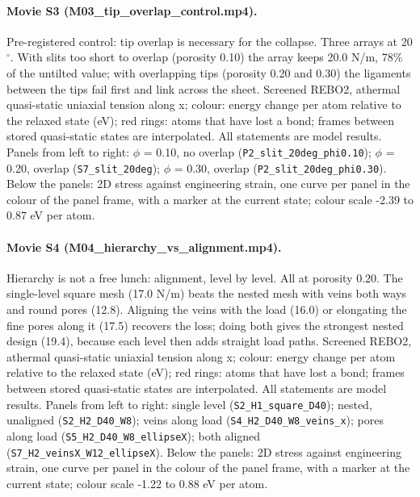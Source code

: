 \paragraph{Movie S3 (M03\_tip\_overlap\_control.mp4).} Pre-registered control: tip overlap is necessary for the collapse. Three arrays at 20$^\circ$. With slits too short to overlap (porosity 0.10) the array keeps 20.0 N/m, 78\% of the untilted value; with overlapping tips (porosity 0.20 and 0.30) the ligaments between the tips fail first and link across the sheet. Screened REBO2, athermal quasi-static uniaxial tension along x; colour: energy change per atom relative to the relaxed state (eV); red rings: atoms that have lost a bond; frames between stored quasi-static states are interpolated. All statements are model results. Panels from left to right: $\phi$ = 0.10, no overlap (\texttt{P2\_slit\_20deg\_phi0.10}); $\phi$ = 0.20, overlap (\texttt{S7\_slit\_20deg}); $\phi$ = 0.30, overlap (\texttt{P2\_slit\_20deg\_phi0.30}). Below the panels: 2D stress against engineering strain, one curve per panel in the colour of the panel frame, with a marker at the current state; colour scale -2.39 to 0.87 eV per atom.

\paragraph{Movie S4 (M04\_hierarchy\_vs\_alignment.mp4).} Hierarchy is not a free lunch: alignment, level by level. All at porosity 0.20. The single-level square mesh (17.0 N/m) beats the nested mesh with veins both ways and round pores (12.8). Aligning the veins with the load (16.0) or elongating the fine pores along it (17.5) recovers the loss; doing both gives the strongest nested design (19.4), because each level then adds straight load paths. Screened REBO2, athermal quasi-static uniaxial tension along x; colour: energy change per atom relative to the relaxed state (eV); red rings: atoms that have lost a bond; frames between stored quasi-static states are interpolated. All statements are model results. Panels from left to right: single level (\texttt{S2\_H1\_square\_D40}); nested, unaligned (\texttt{S2\_H2\_D40\_W8}); veins along load (\texttt{S4\_H2\_D40\_W8\_veins\_x}); pores along load (\texttt{S5\_H2\_D40\_W8\_ellipseX}); both aligned (\texttt{S7\_H2\_veinsX\_W12\_ellipseX}). Below the panels: 2D stress against engineering strain, one curve per panel in the colour of the panel frame, with a marker at the current state; colour scale -1.22 to 0.88 eV per atom.

